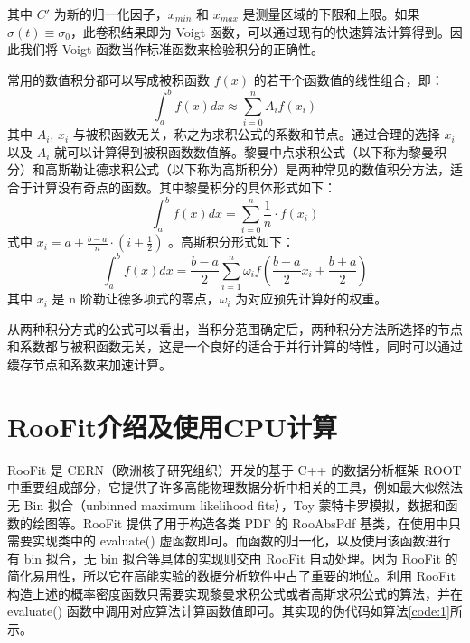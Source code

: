 其中 $C'$ 为新的归一化因子，$x_{min}$ 和 $x_{max}$ 是测量区域的下限和上限。如果 $\sigma(t)\equiv\sigma_0$，此卷积结果即为 Voigt 函数，可以通过现有的快速算法计算得到\supercite{abrarov2011efficient}。因此我们将 Voigt 函数当作标准函数来检验积分的正确性。

常用的数值积分都可以写成被积函数 $f(x)$ 的若干个函数值的线性组合，即：
\begin{equation}
    \int_a^bf(x)dx\approx\sum_{i=0}^n A_i f(x_i)
\end{equation}
其中 $A_i$, $x_i$ 与被积函数无关，称之为求积公式的系数和节点\supercite{jisuanfangfa}。通过合理的选择 $x_i$ 以及 $A_i$ 就可以计算得到被积函数数值解。黎曼中点求积公式（以下称为黎曼积分）和高斯勒让德求积公式（以下称为高斯积分）是两种常见的数值积分方法\supercite{jisuanfangfa}，适合于计算没有奇点的函数。其中黎曼积分的具体形式如下：
\begin{equation}
    \int_a^bf(x)dx = \sum_{i=0}^n \frac{1}{n}\cdot f(x_i)
\end{equation}
式中 $x_i=a+\frac{b-a}{n}\cdot(i+\frac{1}{2})$ 。高斯积分形式如下：
\begin{equation}
\int_a^bf(x)dx=\frac{b-a}{2}\sum_{i=1}^n\omega_if(\frac{b-a}{2}x_i+\frac{b+a}{2})
\end{equation}
其中 $x_i$ 是 n 阶勒让德多项式的零点，$\omega_i$ 为对应预先计算好的权重\supercite{jisuanfangfa}\supercite{bogaert2014iteration}。

从两种积分方式的公式可以看出，当积分范围确定后，两种积分方法所选择的节点和系数都与被积函数无关，这是一个良好的适合于并行计算的特性，同时可以通过缓存节点和系数来加速计算。

\section{RooFit介绍及使用CPU计算}

RooFit 是 CERN（欧洲核子研究组织）开发的基于 C++ 的数据分析框架 ROOT 中重要组成部分\supercite{roofit}\supercite{root}，它提供了许多高能物理数据分析中相关的工具，例如最大似然法无 Bin 拟合（unbinned maximum likelihood fits），Toy 蒙特卡罗模拟，数据和函数的绘图等。RooFit 提供了用于构造各类 PDF 的 RooAbsPdf 基类，在使用中只需要实现类中的 evaluate() 虚函数即可。而函数的归一化，以及使用该函数进行有 bin 拟合，无 bin 拟合等具体的实现则交由 RooFit 自动处理。因为 RooFit 的简化易用性，所以它在高能实验的数据分析软件中占了重要的地位。利用 RooFit 构造上述的概率密度函数只需要实现黎曼求积公式或者高斯求积公式的算法，并在 evaluate() 函数中调用对应算法计算函数值即可。其实现的伪代码如算法\ref{code:1}所示。

